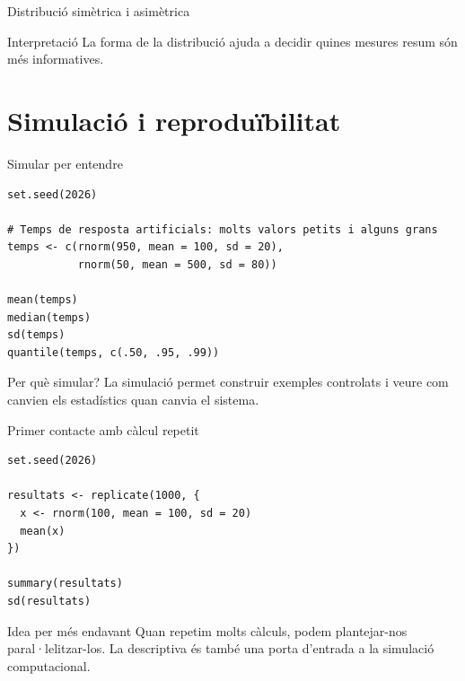 \documentclass[10pt,aspectratio=169]{beamer}
\begin{document}
\begin{frame}{Distribució simètrica i asimètrica}
\begin{center}
\end{center}
\begin{block}{Interpretació}
La forma de la distribució ajuda a decidir quines mesures resum són més informatives.
\end{block}
\end{frame}

\section{Simulació i reproduïbilitat}

\begin{frame}[fragile]{Simular per entendre}
\begin{lstlisting}
set.seed(2026)

# Temps de resposta artificials: molts valors petits i alguns grans
temps <- c(rnorm(950, mean = 100, sd = 20),
           rnorm(50, mean = 500, sd = 80))

mean(temps)
median(temps)
sd(temps)
quantile(temps, c(.50, .95, .99))
\end{lstlisting}
\vspace{0.15cm}
\begin{block}{Per què simular?}
La simulació permet construir exemples controlats i veure com canvien els estadístics quan canvia el sistema.
\end{block}
\end{frame}

\begin{frame}[fragile]{Primer contacte amb càlcul repetit}
\begin{lstlisting}
set.seed(2026)

resultats <- replicate(1000, {
  x <- rnorm(100, mean = 100, sd = 20)
  mean(x)
})

summary(resultats)
sd(resultats)
\end{lstlisting}
\vspace{0.2cm}
\begin{alertblock}{Idea per més endavant}
Quan repetim molts càlculs, podem plantejar-nos paral·lelitzar-los. La descriptiva és també una porta d'entrada a la simulació computacional.
\end{alertblock}
\end{frame}
\end{document}
